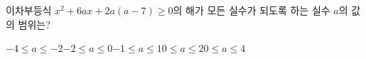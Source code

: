 이차부등식 $x^2+6ax+2a(a-7)\ge 0$의 해가 모든 실수가 되도록 하는 실수 $a$의 값의 범위는?
\begin{choicesii}{$-4\le a\le -2$}{$-2\le a\le 0$}{$-1\le a\le 1$}{$0\le a\le 2$}{$0\le a\le 4$}\end{choicesii}
